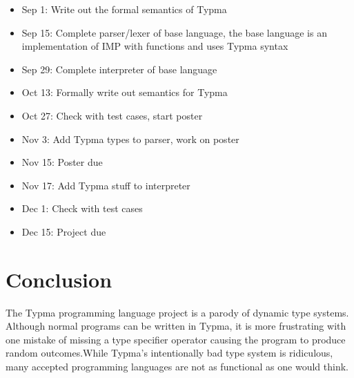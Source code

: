 \documentclass[10pt,twocolumn]{article}
\begin{document}
\begin{itemize}

\item Sep 1: Write out the formal semantics of Typma

\item Sep 15: Complete parser/lexer of base language, the base language is an implementation of IMP with functions and uses Typma syntax

\item Sep 29: Complete interpreter of base language

\item Oct 13: Formally write out semantics for Typma

\item Oct 27: Check with test cases, start poster

\item Nov 3: Add Typma types to parser, work on poster

\item Nov 15: Poster due

\item Nov 17: Add Typma stuff to interpreter

\item Dec 1: Check with test cases

\item Dec 15: Project due

\end{itemize}

\section{Conclusion}

The Typma programming language project is a parody of dynamic type systems. Although normal programs can be written in Typma, it is more frustrating with one mistake of missing a type specifier operator causing the program to produce random outcomes.While Typma's intentionally bad type system is ridiculous, many accepted programming languages are not as functional as one would think.

\printbibliography 
\end{document}
